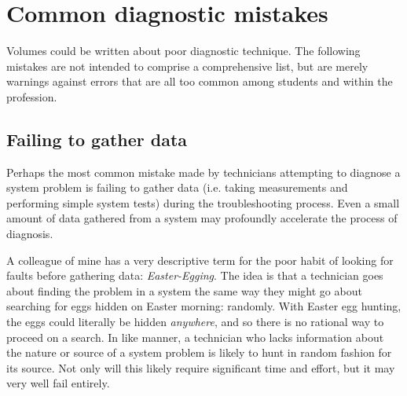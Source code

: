 




















\filbreak
\section{Common diagnostic mistakes}

Volumes could be written about poor diagnostic technique.  The following mistakes are not intended to comprise a comprehensive list, but are merely warnings against errors that are all too common among students and within the profession.






\filbreak
\subsection{Failing to gather data}

Perhaps the most common mistake made by technicians attempting to diagnose a system problem is failing to gather data (i.e. taking measurements and performing simple system tests) during the troubleshooting process.  Even a small amount of data gathered from a system may profoundly accelerate the process of diagnosis.  

A colleague of mine has a very descriptive term for the poor habit of looking for faults before gathering data: \textit{Easter-Egging}.  The idea is that a technician goes about finding the problem in a system the same way they might go about searching for eggs hidden on Easter morning: randomly.  With Easter egg hunting, the eggs could literally be hidden \textit{anywhere}, and so there is no rational way to proceed on a search.  In like manner, a technician who lacks information about the nature or source of a system problem is likely to hunt in random fashion for its source.  Not only will this likely require significant time and effort, but it may very well fail entirely.

